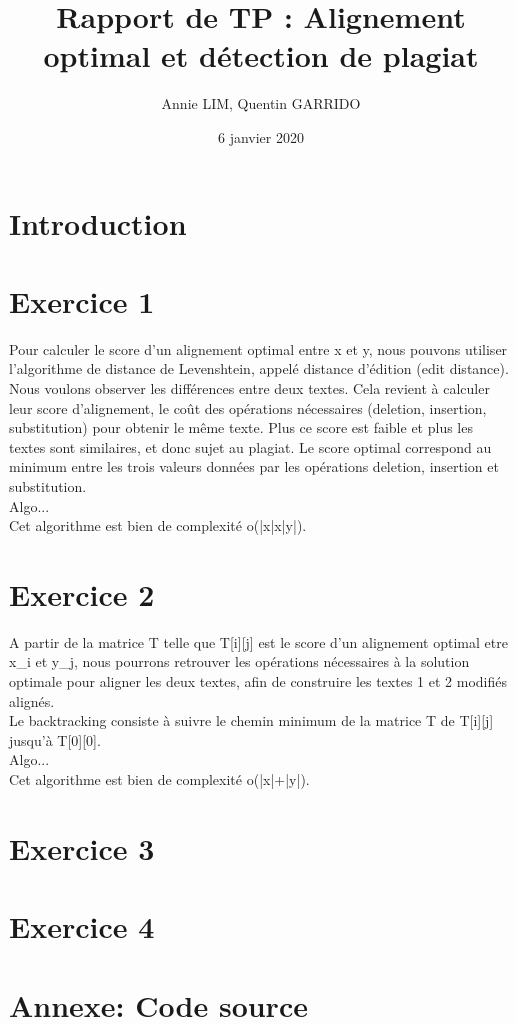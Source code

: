 \documentclass{article}
\title{Rapport de TP : Alignement optimal et détection de plagiat}
\author{Annie LIM, Quentin GARRIDO}
\date{6 janvier 2020}
\begin{document}
\maketitle
\tableofcontents
\pagebreak

\section{Introduction}


\section{Exercice 1}

Pour calculer le score d'un alignement optimal entre x et y, nous pouvons utiliser l'algorithme de distance de Levenshtein, appelé distance d'édition (edit distance).
Nous voulons observer les différences entre deux textes. Cela revient à calculer leur score d'alignement, le coût des opérations nécessaires (deletion, insertion, substitution) pour obtenir le même texte. Plus ce score est faible et plus les textes sont similaires, et donc sujet au plagiat.
Le score optimal correspond au minimum entre les trois valeurs données par les opérations deletion, insertion et substitution. \\
Algo...\\
Cet algorithme est bien de complexité o(|x|x|y|).


\section{Exercice 2}

A partir de la matrice T telle que T[i][j] est le score d'un alignement optimal etre x_{i} et y_{j}, nous pourrons retrouver les opérations nécessaires à la solution optimale pour aligner les deux textes, afin de construire les textes 1 et 2 modifiés alignés.\\
Le backtracking consiste à suivre le chemin minimum de la matrice T de T[i][j] jusqu'à T[0][0].\\
Algo...\\
Cet algorithme est bien de complexité o(|x|+|y|).\\

\section{Exercice 3}


\section{Exercice 4}



\section{Annexe: Code source}
		
\end{document}

